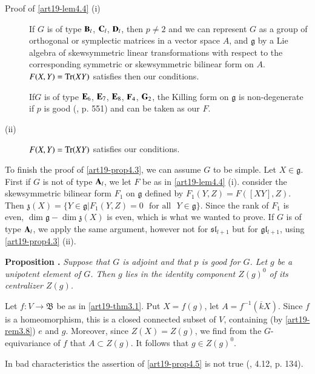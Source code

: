\begin{description}
\item[Proof of \ref{art19-lem4.4} {\rm (i)}]
If $G$ is of type $\mathbf{B}_{l}$, $\mathbf{C}_{l}$, $\mathbf{D}_{l}$, then $p\neq 2$ and we can represent $G$ as a group of orthogonal or symplectic matrices in a vector space $A$, and $\mathfrak{g}$ by a Lie algebra of skewsymmetric linear transformations with respect to the corresponding symmetric or skewsymmetric bilinear form on $A$. $F(X,Y)=\operatorname{\mathrm{Tr}}(XY)$ satisfies then our conditions.

If\pageoriginale $G$ is of type $\mathbf{E}_{6}$, $\mathbf{E}_{7}$, $\mathbf{E}_{8}$, $\mathbf{F}_{4}$, $\mathbf{G}_{2}$, the Killing form on $\mathfrak{g}$ is non-degenerate if $p$ is good (\cite{art19-key12}, p. 551) and can be taken as our $F$.

\item[{\rm(ii)}] $F(X,Y)=\operatorname{\mathrm{Tr}}(XY)$ satisfies our conditions.
\end{description}

To finish the proof of \ref{art19-prop4.3}, we can assume $G$ to be simple. Let $X\in \mathfrak{g}$. First if $G$ is not of type $\mathbf{A}_{l}$, we let $F$ be as in \ref{art19-lem4.4} (i). consider the skewsymmetric bilinear form $F_{1}$ on $\mathfrak{g}$ defined by $F_{1}(Y,Z)=F([XY],Z)$. Then $\mathfrak{z}(X)=\{Y\in \mathfrak{g}|F_{1}(Y,Z)=0\text{~ for all~ } Y\in \mathfrak{g}\}$. Since the rank of $F_{1}$ is even, $\dim \mathfrak{g}-\dim \mathfrak{z}(X)$ is even, which is what we wanted to prove. If $G$ is of type $\mathbf{A}_{l}$, we apply the same argument, however not for $\mathfrak{s}\mathfrak{l}_{l+1}$ but for $\mathfrak{g}\mathfrak{l}_{l+1}$, using \ref{art19-prop4.3} (ii).

\smallskip
\noindent
{\bf Proposition .\label{art19-prop4.5}}
{\em Suppose that $G$ is adjoint and that $p$ is good for $G$. Let $g$ be a unipotent element of $G$. Then $g$ lies in the identity component $Z(g)^{0}$ of its centralizer $Z(g)$.}

Let $f:V\to \mathfrak{B}$ be as in \ref{art19-thm3.1}. Put $X=f(g)$, let $A=f^{-1}(\overline{k}X)$. Since $f$ is a homeomorphism, this is a closed connected subset of $V$, containing (by \ref{art19-rem3.8}) $e$ and $g$. Moreover, since $Z(X)=Z(g)$, we find from the $G$-equivariance of $f$ that $A\subset Z(g)$. It follows that $g\in Z(g)^{0}$.

\begin{remark*}
In bad characteristics the assertion of \ref{art19-prop4.5} is not true (\cite{art19-key14}, 4.12, p. 134).
\end{remark*}


